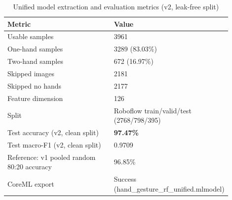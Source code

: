 \begin{table}[H]
\centering
\caption{Unified model extraction and evaluation metrics (v2, leak-free split)}
\label{tab:evaluation_metrics}
\begin{tabular}{p{0.56\linewidth}p{0.34\linewidth}}
\toprule
Metric & Value \\
\midrule
Usable samples & 3961 \\
One-hand samples & 3289 (83.03\%) \\
Two-hand samples & 672 (16.97\%) \\
Skipped images & 2181 \\
Skipped no hands & 2177 \\
Feature dimension & 126 \\
Split & Roboflow train/valid/test (2768/798/395) \\
Test accuracy (v2, clean split) & \textbf{97.47\%} \\
Test macro-F1 (v2, clean split) & 0.9709 \\
Reference: v1 pooled random 80:20 accuracy & 96.85\% \\
CoreML export & Success (hand\_gesture\_rf\_unified.mlmodel) \\
\bottomrule
\end{tabular}
\end{table}
